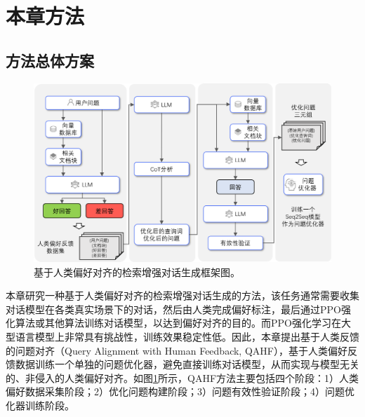 \section{本章方法}

\subsection{方法总体方案}

\begin{figure}[htbp]
	\centering
	\includegraphics[scale=0.57]{Fig/qahf_framework.png}
	\caption{\label{qahf_framework}基于人类偏好对齐的检索增强对话生成框架图。}
\end{figure}

本章研究一种基于人类偏好对齐的检索增强对话生成的方法，该任务通常需要收集对话模型在各类真实场景下的对话，然后由人类完成偏好标注，最后通过PPO强化算法或其他算法训练对话模型，以达到偏好对齐的目的。而PPO强化学习在大型语言模型上非常具有挑战性，训练效果稳定性低。因此，本章提出基于人类反馈的问题对齐（Query Alignment with Human Feedback, QAHF），基于人类偏好反馈数据训练一个单独的问题优化器，避免直接训练对话模型，从而实现与模型无关的、非侵入的人类偏好对齐。如图\ref{qahf_framework}所示，QAHF方法主要包括四个阶段：1）人类偏好数据采集阶段；2）优化问题构建阶段；3）问题有效性验证阶段；4）问题优化器训练阶段。

